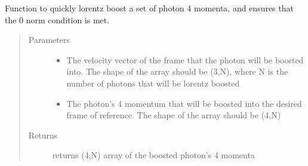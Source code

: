 \documentclass[letterpaper,10pt,english]{sphinxmanual}
\begin{document}

\begin{fulllineitems}
\label{\detokenize{mclib:mclib.lorentzBoostVectorized}}
Function to quickly lorentz boost a set of photon 4 momenta, and ensures that the 0 norm condition is met.
\begin{quote}\begin{description}
\item[{Parameters}] \leavevmode\begin{itemize}
\item {} 
 \textendash{} The velocity vector of the frame that the photon will be boosted into. The shape of the array
should be (3,N), where N is the number of photons that will be lorentz boosted

\item {} 
 \textendash{} The photon’s 4 momentum that will be boosted into the desired frame of reference. The shape of the array
should be (4,N)

\end{itemize}

\item[{Returns}] \leavevmode
returns (4,N) array of the boosted photon’s 4 momenta

\end{description}\end{quote}

\end{fulllineitems}

\end{document}
